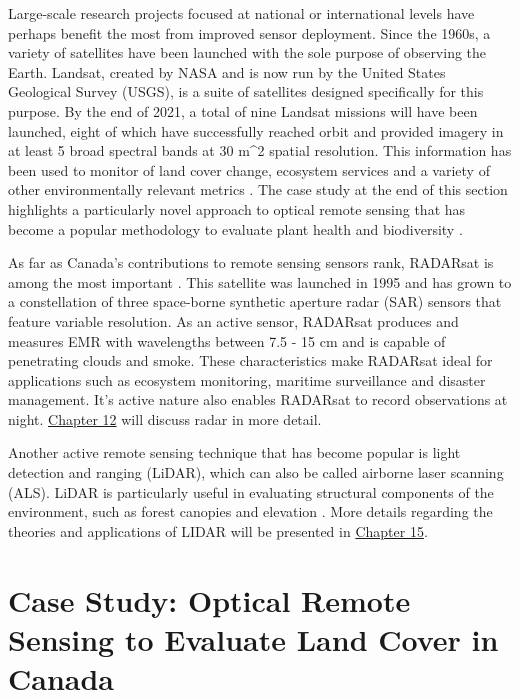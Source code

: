 \documentclass[
]{book}
\begin{document}
Large-scale research projects focused at national or international
levels have perhaps benefit the most from improved sensor deployment.
Since the 1960s, a variety of satellites have been launched with the
sole purpose of observing the Earth. Landsat, created by NASA and is now
run by the United States Geological Survey (USGS), is a suite of
satellites designed specifically for this purpose. By the end of 2021, a
total of nine Landsat missions will have been launched, eight of which
have successfully reached orbit and provided imagery in at least 5 broad
spectral bands at 30 m\^{}2 spatial resolution. This information has been
used to monitor of land cover change, ecosystem services and a variety
of other environmentally relevant metrics \citep{deel_relationship_2012}. The case study at
the end of this section highlights a particularly novel approach to
optical remote sensing that has become a popular methodology to evaluate
plant health and biodiversity \citep{ustin_imaging_2009, wang_spatial_2018}.

As far as Canada's contributions to remote sensing sensors rank,
RADARsat is among the most important \citep{raney_radarsat_1991}. This satellite was
launched in 1995 and has grown to a constellation of three space-borne
synthetic aperture radar (SAR) sensors that feature variable resolution.
As an active sensor, RADARsat produces and measures EMR with wavelengths
between 7.5 - 15 cm and is capable of penetrating clouds and smoke. These characteristics make RADARsat ideal for applications
such as ecosystem monitoring, maritime surveillance and disaster
management. It's active nature also enables RADARsat to record
observations at night. \href{https://ubc-geomatics-textbook.github.io/geomatics-textbook/remote-sensing-systems.html}{Chapter 12} will discuss radar in more detail.

Another active remote sensing technique that has become popular is light
detection and ranging (LiDAR), which can also be called airborne laser
scanning (ALS). LiDAR is particularly useful in evaluating structural
components of the environment, such as forest canopies and elevation
\citep{coops_estimating_2007}. More details regarding the theories and applications of
LIDAR will be presented in \href{https://ubc-geomatics-textbook.github.io/geomatics-textbook/LiDAR-acquistion-and-anlysis.html}{Chapter 15}.

\hypertarget{case-study-optical-remote-sensing-to-evaluate-land-cover-in-canada}{%
\section{Case Study: Optical Remote Sensing to Evaluate Land Cover in Canada}\label{case-study-optical-remote-sensing-to-evaluate-land-cover-in-canada}}
\end{document}
